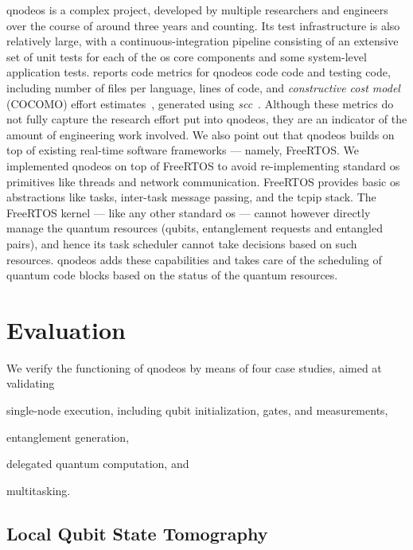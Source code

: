 \acrshort{qnodeos} is a complex project, developed by multiple researchers and engineers over the
course of around three years and counting. Its test infrastructure is also relatively large, with a
continuous-integration pipeline consisting of an extensive set of unit tests for each of the
\acrshort{os} core components and some system-level application tests. 
reports code metrics for \acrshort{qnodeos} code code and testing code, including number of files
per language, lines of code, and \emph{constructive cost model} (COCOMO) effort
estimates~\cite{boehm_2009}, generated using \textit{scc}~\cite{scc}. Although these metrics do not
fully capture the research effort put into \acrshort{qnodeos}, they are an indicator of the amount
of engineering work involved. We also point out that \acrshort{qnodeos} builds on top of existing
real-time software frameworks --- namely, FreeRTOS. We implemented \acrshort{qnodeos} on top of
FreeRTOS to avoid re-implementing standard \acrshort{os} primitives like threads and network
communication. FreeRTOS provides basic \acrshort{os} abstractions like tasks, inter-task message
passing, and the \acrshort{tcpip} stack. The FreeRTOS kernel --- like any other standard
\acrshort{os} --- cannot however directly manage the quantum resources (qubits, entanglement
requests and entangled pairs), and hence its task scheduler cannot take decisions based on such
resources. \acrshort{qnodeos} adds these capabilities and takes care of the scheduling of quantum
code blocks based on the status of the quantum resources.
\section{Evaluation}
\label{sec:qnodeos:evaluation}

We verify the functioning of \acrshort{qnodeos} by means of four case studies, aimed at validating
\begin{inlinelist}
    \item single-node execution, including qubit initialization, gates, and measurements,
    \item entanglement generation,
    \item delegated quantum computation, and
    \item multitasking.
\end{inlinelist}

\subsection{Local Qubit State Tomography}

